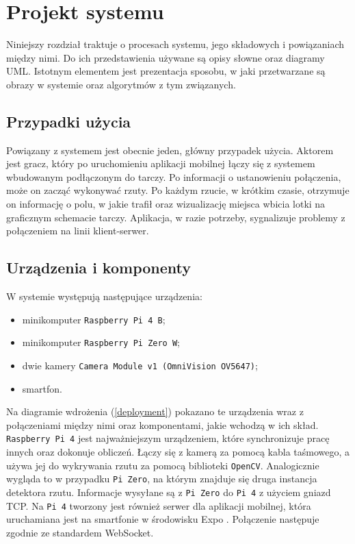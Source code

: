 \chapter{Projekt systemu}
\thispagestyle{chapterBeginStyle}

Niniejszy rozdział traktuje o procesach systemu, jego składowych i powiązaniach między nimi. Do ich przedstawienia używane są opisy słowne oraz diagramy UML. Istotnym elementem jest prezentacja sposobu, w jaki przetwarzane są obrazy w systemie oraz algorytmów z tym związanych.

\section{Przypadki użycia}
Powiązany z systemem jest obecnie jeden, główny przypadek użycia. Aktorem jest gracz, który po uruchomieniu aplikacji mobilnej łączy się z systemem wbudowanym podłączonym do tarczy. Po informacji o ustanowieniu połączenia, może on zacząć wykonywać rzuty. Po każdym rzucie, w krótkim czasie, otrzymuje on informację o polu, w jakie trafił oraz wizualizację miejsca wbicia lotki na graficznym schemacie tarczy. Aplikacja, w razie potrzeby, sygnalizuje problemy z połączeniem na linii klient-serwer.

\section{Urządzenia i komponenty}
W systemie występują następujące urządzenia:
\begin{itemize}
  \item minikomputer \verb|Raspberry Pi 4 B|;
  \item minikomputer \verb|Raspberry Pi Zero W|;
  \item dwie kamery \verb|Camera Module v1 (OmniVision OV5647)|;
  \item smartfon.
\end{itemize}

Na diagramie wdrożenia (\ref{deployment}) pokazano te urządzenia wraz z połączeniami między nimi oraz komponentami, jakie wchodzą w ich skład. \verb|Raspberry Pi 4| jest najważniejszym urządzeniem, które synchronizuje pracę innych oraz dokonuje obliczeń. Łączy się z kamerą za pomocą kabla taśmowego, a używa jej do wykrywania rzutu za pomocą biblioteki \verb|OpenCV|. Analogicznie wygląda to w przypadku \verb|Pi Zero|, na którym znajduje się druga instancja detektora rzutu. Informacje wysyłane są z \verb|Pi Zero| do \verb|Pi 4| z użyciem gniazd TCP. Na \verb|Pi 4| tworzony jest również serwer dla aplikacji mobilnej, która uruchamiana jest na smartfonie w środowisku Expo \cite{expo}. Połączenie następuje zgodnie ze standardem WebSocket.

